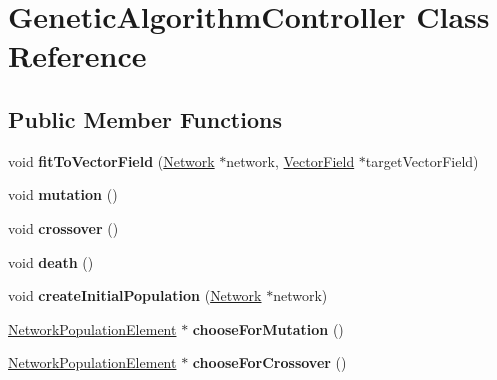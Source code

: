 \hypertarget{classGeneticAlgorithmController}{}\section{Genetic\+Algorithm\+Controller Class Reference}
\label{classGeneticAlgorithmController}
\subsection*{Public Member Functions}
\begin{DoxyCompactItemize}
\item 
void {\bfseries fit\+To\+Vector\+Field} (\hyperlink{classNetwork}{Network} $\ast$network, \hyperlink{classVectorField}{Vector\+Field} $\ast$target\+Vector\+Field)\hypertarget{classGeneticAlgorithmController_a85887ad28acae9e6f01ed15a5eb8485d}{}\label{classGeneticAlgorithmController_a85887ad28acae9e6f01ed15a5eb8485d}

\item 
void {\bfseries mutation} ()\hypertarget{classGeneticAlgorithmController_aeb407ce174447ffd7ef2041af727e23d}{}\label{classGeneticAlgorithmController_aeb407ce174447ffd7ef2041af727e23d}

\item 
void {\bfseries crossover} ()\hypertarget{classGeneticAlgorithmController_aaa7228fb8a37d5b1745c4854d4aa5d46}{}\label{classGeneticAlgorithmController_aaa7228fb8a37d5b1745c4854d4aa5d46}

\item 
void {\bfseries death} ()\hypertarget{classGeneticAlgorithmController_a7586971212107be4213a0151e347a069}{}\label{classGeneticAlgorithmController_a7586971212107be4213a0151e347a069}

\item 
void {\bfseries create\+Initial\+Population} (\hyperlink{classNetwork}{Network} $\ast$network)\hypertarget{classGeneticAlgorithmController_a25892138421bc984d1e7bc069d42b276}{}\label{classGeneticAlgorithmController_a25892138421bc984d1e7bc069d42b276}

\item 
\hyperlink{classNetworkPopulationElement}{Network\+Population\+Element} $\ast$ {\bfseries choose\+For\+Mutation} ()\hypertarget{classGeneticAlgorithmController_a467ce68b08437543a6ccdd8bfc04a0aa}{}\label{classGeneticAlgorithmController_a467ce68b08437543a6ccdd8bfc04a0aa}

\item 
\hyperlink{classNetworkPopulationElement}{Network\+Population\+Element} $\ast$ {\bfseries choose\+For\+Crossover} ()\hypertarget{classGeneticAlgorithmController_ab7e07c9d2cc53fa1964d11b2f6a6294a}{}\label{classGeneticAlgorithmController_ab7e07c9d2cc53fa1964d11b2f6a6294a}


\end{DoxyCompactItemize}
